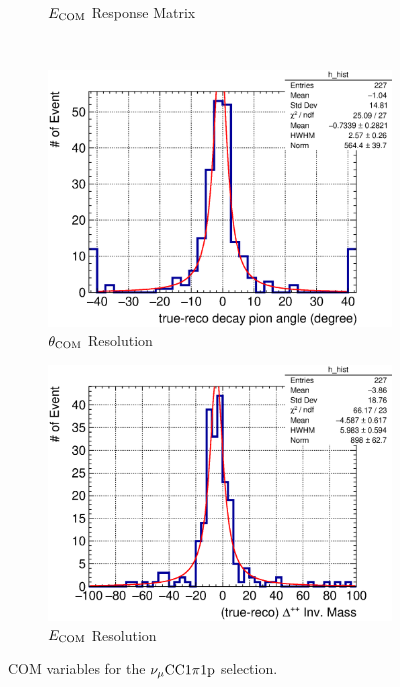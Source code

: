 \begin{figure}
\begin{subfigure}[b]{\dbfigwid\textwidth}
               \caption{$E_{\textrm{COM}}$ Response Matrix}
               \label{subfig:reco-com-e-resmat}
          \end{subfigure}
          \\
          \begin{subfigure}[b]{\dbfigwid\textwidth}
               \centering
               \includegraphics[width=\textwidth]{figures/COM/SFGpTPCmu_dang_res_hist_al15.eps}
               \caption{$\theta_{\textrm{COM}}$ Resolution}
               \label{subfig:reco-com-t-res}
          \end{subfigure}
          \begin{subfigure}[b]{\dbfigwid\textwidth}
               \centering
               \includegraphics[width=\textwidth]{figures/COM/SFGpTPCmu_edelta_res_hist_al15.eps}
               \caption{$E_{\textrm{COM}}$ Resolution}
               \label{subfig:reco-com-e-res}
          \end{subfigure}
          \caption{COM variables for the $\nu_{\mu}\textrm{CC}1\pi1\textrm{p}$ selection.}
          \label{fig:com-reco}
     \end{figure}
